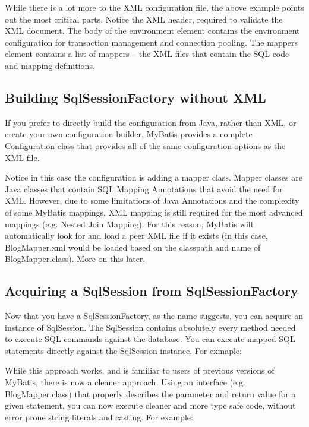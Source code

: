 

While there is a lot more to the XML configuration file, the above example points out the most critical parts. Notice the XML header, required to validate the XML document. The body of the environment element contains the environment configuration for transaction management and connection pooling. The mappers element contains a list of mappers – the XML files that contain the SQL code and mapping definitions.
\subsection{Building SqlSessionFactory without XML}
If you prefer to directly build the configuration from Java, rather than XML, or create your own configuration builder, MyBatis provides a complete Configuration class that provides all of the same configuration options as the XML file.



Notice in this case the configuration is adding a mapper class. Mapper classes are Java classes that contain SQL Mapping Annotations that avoid the need for XML. However, due to some limitations of Java Annotations and the complexity of some MyBatis mappings, XML mapping is still required for the most advanced mappings (e.g. Nested Join Mapping). For this reason, MyBatis will automatically look for and load a peer XML file if it exists (in this case, BlogMapper.xml would be loaded based on the classpath and name of BlogMapper.class). More on this later.

\subsection{Acquiring a SqlSession from SqlSessionFactory}

Now that you have a SqlSessionFactory, as the name suggests, you can acquire an instance of SqlSession. The SqlSession contains absolutely every method needed to execute SQL commands against the database. You can execute mapped SQL statements directly against the SqlSession instance. For exmaple:



While this approach works, and is familiar to users of previous versions of MyBatis, there is now a cleaner approach. Using an interface (e.g. BlogMapper.class) that properly describes the parameter and return value for a given statement, you can now execute cleaner and more type safe code, without error prone string literals and casting.
For example:

